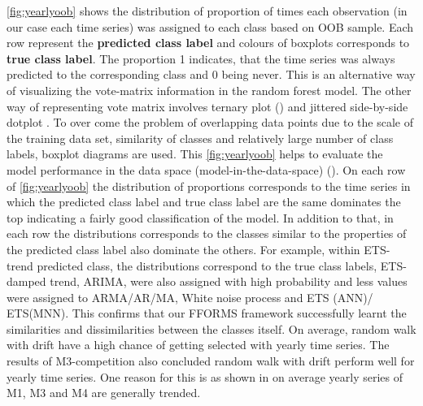 \documentclass[11pt,a4paper,]{article}
\begin{document}
\autoref{fig:yearlyoob} shows the distribution of proportion of times
each observation (in our case each time series) was assigned to each
class based on OOB sample. Each row represent the \textbf{predicted
class label} and colours of boxplots corresponds to \textbf{true class
label}. The proportion 1 indicates, that the time series was always
predicted to the corresponding class and 0 being never. This is an
alternative way of visualizing the vote-matrix information in the random
forest model. The other way of representing vote matrix involves ternary
plot (\textcite{sutherland2000orca}) and jittered side-by-side dotplot
\autocites{ehrlinger2015ggrandomforests}{da2017interactive}. To over
come the problem of overlapping data points due to the scale of the
training data set, similarity of classes and relatively large number of
class labels, boxplot diagrams are used. This \autoref{fig:yearlyoob}
helps to evaluate the model performance in the data space
(model-in-the-data-space) (\textcite{da2017interactive}). On each row of
\autoref{fig:yearlyoob} the distribution of proportions corresponds to
the time series in which the predicted class label and true class label
are the same dominates the top indicating a fairly good classification
of the model. In addition to that, in each row the distributions
corresponds to the classes similar to the properties of the predicted
class label also dominate the others. For example, within ETS-trend
predicted class, the distributions correspond to the true class labels,
ETS-damped trend, ARIMA, were also assigned with high probability and
less values were assigned to ARMA/AR/MA, White noise process and ETS
(ANN)/ ETS(MNN). This confirms that our FFORMS framework successfully
learnt the similarities and dissimilarities between the classes itself.
On average, random walk with drift have a high chance of getting
selected with yearly time series. The results of M3-competition also
concluded random walk with drift perform well for yearly time series.
One reason for this is as shown in \textcite{kang2018efficient} on
average yearly series of M1, M3 and M4 are generally trended.
\end{document}
